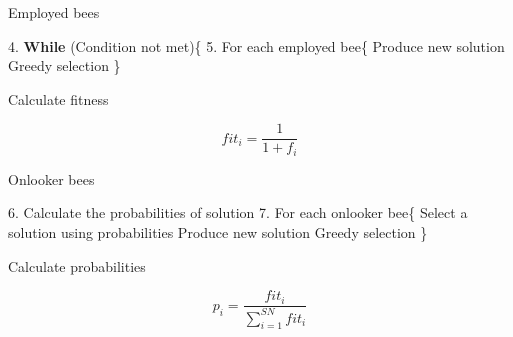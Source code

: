 \documentclass[14pt,ignorenonframetext,compress]{beamer}
\newenvironment{Shaded}{\begin{snugshade}}{\end{snugshade}}
\newcommand{\FloatTok}[1]{\textcolor[rgb]{0.00,0.00,0.81}{#1}}
\newcommand{\KeywordTok}[1]{\textcolor[rgb]{0.13,0.29,0.53}{\textbf{#1}}}
\newcommand{\NormalTok}[1]{#1}
\renewenvironment{Shaded}{\color{black}\begin{snugshade}\color{black}}{\end{snugshade}}
\begin{document}
\begin{frame}[fragile]{Employed bees}
\protect\hypertarget{employed-bees-1}{}

\begin{Shaded}
\begin{Highlighting}[]
 \FloatTok{4.} \KeywordTok{While}\NormalTok{ (Condition not met)\{}
 \FloatTok{5.}\NormalTok{ For each employed bee\{}
\NormalTok{     Produce new solution }
\NormalTok{     Greedy selection \}}
\end{Highlighting}
\end{Shaded}

\begin{block}{Calculate fitness}

\[fit_i = \frac{1}{1+f_i}\]

\end{block}

\end{frame}

\begin{frame}[fragile]{Onlooker bees}
\protect\hypertarget{onlooker-bees}{}

\begin{Shaded}
\begin{Highlighting}[]
 \FloatTok{6.}\NormalTok{ Calculate the probabilities of solution}
 \FloatTok{7.}\NormalTok{ For each onlooker bee\{  }
\NormalTok{     Select a solution using probabilities}
\NormalTok{     Produce new solution}
\NormalTok{     Greedy selection \}}
          
\end{Highlighting}
\end{Shaded}

\begin{block}{Calculate probabilities}

\[p_i = \frac{fit_i}{\sum^{SN}_{i=1} fit_i}\]

\end{block}

\end{frame}
\end{document}
